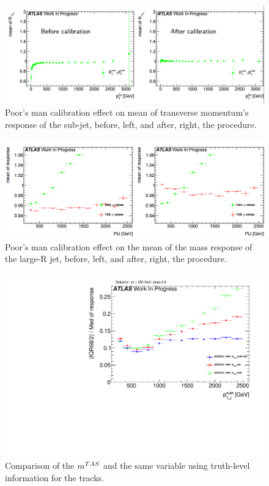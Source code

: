 \begin{figure}[!ht]
  \centering
      \includegraphics[width=\textwidth]{jet_part/calib/perfectcalib2.png}
  \caption{Poor's man calibration effect on mean of transverse momentum's response of the sub-jet, before, left, and after, right, the procedure.}
  \label{fig:calibA}
\end{figure}

\begin{figure}[!ht]
  \centering
      \includegraphics[width=\textwidth]{jet_part/calib/perfectcalib3.png}
  \caption{Poor's man calibration effect on the mean of the mass response of the large-R jet, before, left, and after, right, the procedure.}
  \label{fig:calibA2}
\end{figure}


\begin{figure}[!ht]
  \centering
      \includegraphics[width=\textwidth]{jet_part/calib/71graphcftr_h_JetRatio_mJ12CALOIQRoMcalib_degradW.pdf}
  \caption{Comparison of the $m^{TAS}$ and the same variable using truth-level information for the tracks.}
  \label{fig:breakdown1}
\end{figure}